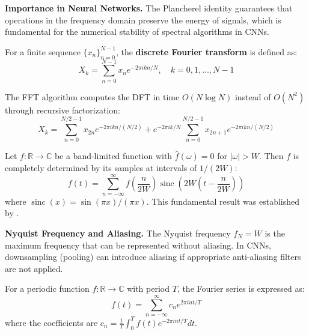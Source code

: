 \textbf{Importance in Neural Networks.} The Plancherel identity guarantees that operations in the frequency domain preserve the energy of signals, which is fundamental for the numerical stability of spectral algorithms in CNNs.

\begin{definition}\label{def:dft}
For a finite sequence $\{x_n\}_{n=0}^{N-1}$, the \textbf{discrete Fourier transform} is defined as:
\begin{equation}
X_k = \sum_{n=0}^{N-1} x_n e^{-2\pi i kn/N}, \quad k = 0, 1, \ldots, N-1
\end{equation}
\end{definition}

\begin{definition}\label{def:fft}
The \gls{FFT} algorithm computes the DFT in time $O(N \log N)$ instead of $O(N^2)$ through recursive factorization:
\begin{equation}
X_k = \sum_{n=0}^{N/2-1} x_{2n} e^{-2\pi i kn/(N/2)} + e^{-2\pi i k/N} \sum_{n=0}^{N/2-1} x_{2n+1} e^{-2\pi i kn/(N/2)}
\end{equation}
\end{definition}

\begin{theorem}\label{thm:nyquist_shannon}
Let $f: \mathbb{R} \to \mathbb{C}$ be a band-limited function with $\hat{f}(\omega) = 0$ for $|\omega| > W$. Then $f$ is completely determined by its samples at intervals of $1/(2W)$:
\begin{equation}
f(t) = \sum_{n=-\infty}^{\infty} f\left(\frac{n}{2W}\right) \operatorname{sinc}(2W(t - \frac{n}{2W}))
\end{equation}
where $\operatorname{sinc}(x) = \sin(\pi x)/(\pi x)$. This fundamental result was established by \citet{Shannon1948}.
\end{theorem}

\textbf{Nyquist Frequency and Aliasing.} The Nyquist frequency $f_N = W$ is the maximum frequency that can be represented without aliasing. In CNNs, downsampling (pooling) can introduce aliasing if appropriate anti-aliasing filters are not applied.

\begin{definition}\label{def:serie_fourier}
For a periodic function $f: \mathbb{R} \to \mathbb{C}$ with period $T$, the Fourier series is expressed as:
\begin{equation}
f(t) = \sum_{n=-\infty}^{\infty} c_n e^{2\pi i n t/T}
\end{equation}
where the coefficients are $c_n = \frac{1}{T} \int_0^T f(t) e^{-2\pi i n t/T} dt$.
\end{definition}

